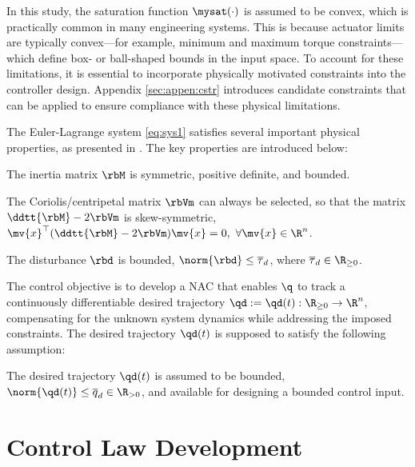 \documentclass[letterpaper, journal]{IEEEtran}
\begin{document}
In this study, the saturation function $\mysat(\cdot)$ is assumed to be convex, which is practically common in many engineering systems.
This is because actuator limits are typically convex—for example, minimum and maximum torque constraints—which define box- or ball-shaped bounds in the input space.
To account for these limitations, it is essential to incorporate physically motivated constraints into the controller design.
Appendix \ref{sec:appen:cstr} introduces candidate constraints that can be applied to ensure compliance with these physical limitations.

The Euler-Lagrange system \eqref{eq:sys1} satisfies several important physical properties, as presented in \cite[Chap. 3, Tab. 3.2.1]{Lewis:1998aa}. 
The key properties are introduced below:
\begin{prop} 
    The inertia matrix $\rbM$ is symmetric, positive definite, and bounded.
    \label{prop:M}
\end{prop}

\begin{prop} 
    The Coriolis/centripetal matrix $\rbVm$ can always be selected, so that the matrix $\ddtt{\rbM}-2\rbVm$ is skew-symmetric, \ie $\mv{x}^\top(\ddtt{\rbM}-2\rbVm)\mv{x}=0,\ \forall \mv{x}\in\R^n$.
    \label{prop:skew}
\end{prop}

\begin{prop}
    The disturbance $\rbd$ is bounded, \ie $\norm{\rbd}\le \overline\tau_d$, where $\overline\tau_d\in\R_{\ge0}$.
    \label{prop:dis_bound}
\end{prop}

The control objective is to develop a NAC that enables $\q$ to track a continuously differentiable desired trajectory $\qd:=\qd(t): \R_{\ge0} \to \R^n$, compensating for the unknown system dynamics while addressing the imposed constraints.
The desired trajectory $\qd(t)$ is supposed to satisfy the following assumption:
\begin{assum}
    The desired trajectory $\qd(t)$ is assumed to be bounded, \ie $\norm{\qd(t)}\le \overline{q}_d\in\R_{>0}$, and available for designing a bounded control input.
    \label{assum:feasible}
\end{assum}

\section{Control Law Development}\label{sec:ctrl design}
\end{document}
